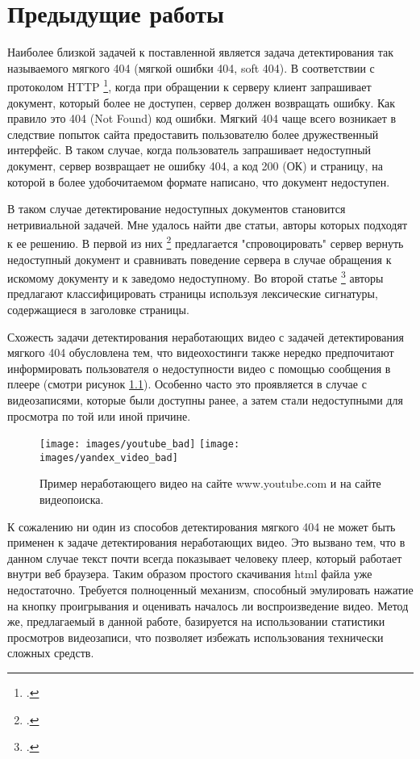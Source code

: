 \chapter{Предыдущие работы}

Наиболее близкой задачей к поставленной является задача детектирования так называемого мягкого 404 (мягкой ошибки 404, soft 404). В соответствии с протоколом HTTP \footcite{Fielding2014}, когда при обращении к серверу клиент запрашивает документ, который более не доступен, сервер должен возвращать ошибку. Как правило это 404 (Not Found) код ошибки. Мягкий 404 чаще всего возникает в следствие попыток сайта предоставить пользователю более дружественный интерфейс. В таком случае, когда пользователь запрашивает недоступный документ, сервер возвращает не ошибку 404, а код 200 (ОК) и страницу, на которой в более удобочитаемом формате написано, что документ недоступен.

В таком случае детектирование недоступных документов становится нетривиальной задачей. Мне удалось найти две статьи, авторы которых подходят к ее решению. В первой из них \footcite{Bar-Yossef2004} предлагается "спровоцировать" сервер вернуть недоступный документ и сравнивать поведение сервера в случае обращения к искомому документу и к заведомо недоступному. Во второй статье \footcite{Meneses2012} авторы предлагают классифицировать страницы используя лексические сигнатуры, содержащиеся в заголовке страницы.

Схожесть задачи детектирования неработающих видео с задачей детектирования мягкого 404 обусловлена тем, что видеохостинги также нередко предпочитают информировать пользователя о недоступности видео с помощью сообщения в плеере (смотри рисунок \ref{fig:bad_video}). Особенно часто это проявляется в случае с видеозаписями, которые были доступны ранее, а затем стали недоступными для просмотра по той или иной причине.

\begin{figure}
    \centering
    \texttt{[image: images/youtube\_bad]}
    \texttt{[image: images/yandex\_video\_bad]}
    \caption{Пример неработающего видео на сайте www.youtube.com и на сайте видеопоиска.}
    \label{fig:bad_video}
\end{figure}

К сожалению ни один из способов детектирования мягкого 404 не может быть применен к задаче детектирования неработающих видео. Это вызвано тем, что в данном случае текст почти всегда показывает человеку плеер, который работает внутри веб браузера. Таким образом простого скачивания html файла уже недостаточно. Требуется полноценный механизм, способный эмулировать нажатие на кнопку проигрывания и оценивать началось ли воспроизведение видео. Метод же, предлагаемый в данной работе, базируется на использовании статистики просмотров видеозаписи, что позволяет избежать использования технически сложных средств.